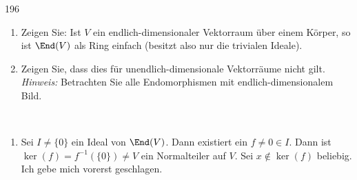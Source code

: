\begin{algebraUE}{196}
\begin{enumerate}
  \item Zeigen Sie: Ist $V$ ein endlich-dimensionaler Vektorraum über einem
  Körper, so ist $\End(V)$ als Ring einfach (besitzt also nur die trivialen Ideale).
  \item Zeigen Sie, dass dies für unendlich-dimensionale Vektorräume nicht gilt. \\
  \textit{Hinweis:} Betrachten Sie alle Endomorphismen mit endlich-dimensionalem Bild.
\end{enumerate}
\end{algebraUE}
\begin{solution}
\leavevmode \\
\begin{enumerate}
  \item Sei $I \neq \{0\}$ ein Ideal von $\End(V)$. Dann existiert ein $f \neq 0 \in I$.
  Dann ist $\ker(f) = f^{-1}(\{0\}) \neq V$ ein Normalteiler auf $V$.
  Sei $x \notin \ker(f)$ beliebig. Ich gebe mich vorerst geschlagen.
\end{enumerate}
\end{solution}
